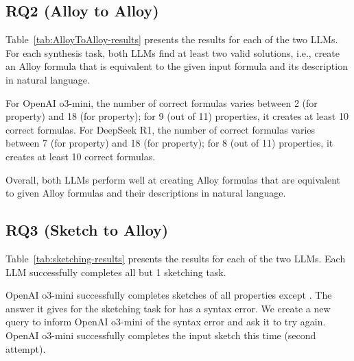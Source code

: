 


\subsection{RQ2 (Alloy to Alloy)}



Table~\ref{tab:AlloyToAlloy-results} presents the results for each of the two LLMs. For each synthesis task, both LLMs find at least two valid solutions, i.e., create an Alloy formula that is equivalent to the given input formula and its description in natural language.

For OpenAI o3-mini, the number of correct formulas varies between 2 (for  property) and 18 (for  property); for 9 (out of 11) properties, it creates at least 10 correct formulas. For DeepSeek R1, the number of correct formulas varies between 7 (for  property) and 18 (for  property); for 8 (out of 11) properties, it creates at least 10 correct formulas.

Overall, both LLMs perform well at creating Alloy formulas that are equivalent to given Alloy formulas and their descriptions in natural language.

\subsection{RQ3 (Sketch to Alloy)}



Table~\ref{tab:sketching-results} presents the results for each of the two LLMs. Each LLM successfully completes all but 1 sketching task.

OpenAI o3-mini successfully completes sketches of all properties except . The answer it gives for the sketching task for  has a syntax error.  We create a new query to inform OpenAI o3-mini of the syntax error and ask it to try again.  OpenAI o3-mini successfully completes the input sketch this time (second attempt).

